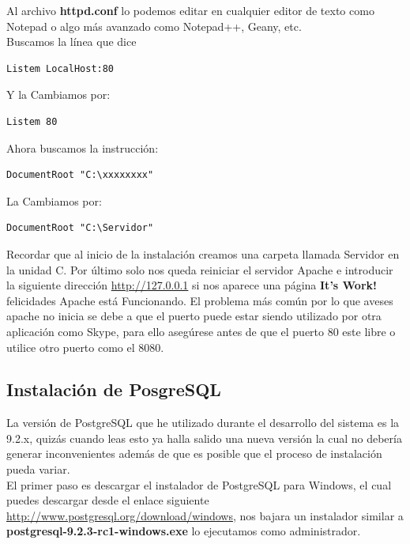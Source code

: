 Al archivo {\bfseries httpd.conf} lo podemos editar en cualquier editor de texto como Notepad o algo más avanzado como Notepad++, Geany, etc. \\[0.5cm]

Buscamos la línea que dice

\begin{lstlisting}[style=consola, numbers=none]
    Listem LocalHost:80
\end{lstlisting}

Y la Cambiamos por:

\begin{lstlisting}[style=consola, numbers=none]
    Listem 80
\end{lstlisting}

Ahora buscamos la instrucción:

\begin{lstlisting}[style=consola, numbers=none]
    DocumentRoot "C:\xxxxxxxx"
\end{lstlisting}

La Cambiamos por:

\begin{lstlisting}[style=consola, numbers=none]
    DocumentRoot "C:\Servidor"
\end{lstlisting}

Recordar que al inicio de la instalación creamos una carpeta llamada Servidor en la unidad C. Por último solo nos queda reiniciar el servidor Apache e introducir la siguiente dirección \url{http://127.0.0.1} si nos aparece una página {\bfseries It's Work!} felicidades Apache está Funcionando. El problema más común por lo que aveses apache no inicia se debe a que el puerto puede estar siendo utilizado por otra aplicación como Skype, para ello asegúrese antes de que el puerto 80 este libre o utilice otro puerto como el 8080.


\subsection{Instalación de PosgreSQL}

La versión de PostgreSQL que he utilizado durante el desarrollo del sistema es la 9.2.x, quizás cuando leas esto ya halla salido una nueva versión la cual no debería generar inconvenientes además de que es posible que el proceso de instalación pueda variar.\\[0.2cm]
 
El primer paso es descargar el instalador de PostgreSQL para Windows, el cual puedes descargar desde el enlace siguiente \url{http://www.postgresql.org/download/windows}, nos bajara un instalador similar
a {\bfseries postgresql-9.2.3-rc1-windows.exe} lo ejecutamos como administrador.\\[0.2cm]

